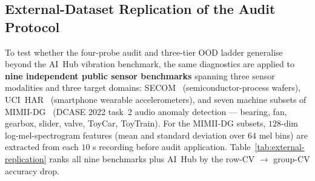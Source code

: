 \documentclass[3p,times,authoryear]{elsarticle}
\theoremstyle{remark}
\begin{document}
\subsection{External-Dataset Replication of the Audit Protocol}\label{sec:res-external}

To test whether the four-probe audit and three-tier OOD ladder
generalise beyond the AI~Hub vibration benchmark, the same
diagnostics are applied to \textbf{nine independent public
sensor benchmarks} spanning three sensor modalities and three
target domains: SECOM~\cite{mccann2008secom}
(semiconductor-process wafers),
UCI~HAR~\cite{anguita2013har} (smartphone wearable
accelerometers), and seven machine subsets of
MIMII-DG~\cite{dohi2022mimii,koizumi2020mimii} (DCASE 2022
task~2 audio anomaly detection --- bearing, fan, gearbox,
slider, valve, ToyCar, ToyTrain). For
the MIMII-DG subsets, $128$-dim log-mel-spectrogram features
(mean and standard deviation over $64$ mel bins) are extracted
from each $10$ s recording before audit application.
Table~\ref{tab:external-replication} ranks all nine benchmarks
plus AI~Hub by the row-CV $\to$ group-CV accuracy drop.
\end{document}
